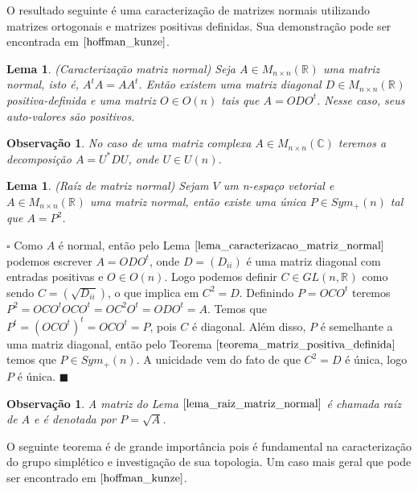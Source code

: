 \documentclass[12pt]{book}
\newtheorem{lema}[teorema]{Lema}
\newtheorem{observacao}[teorema]{Observação}
\newenvironment{prova}[1]{$\square$ #1}{\hfill$\blacksquare$}
\newcommand{\generalgroup}[2]{GL(#1, #2)}
\newcommand{\generalgroupreal}[1]{\generalgroup{#1}{\real{}}}
\newcommand{\matrizortogonal}[1]{O(#1)}
\newcommand{\matrizquadreal}[1]{M_{#1 \times #1}(\real{})}
\newcommand{\matrizsimetricapositiva}[1]{Sym_{+}(#1)}
\newcommand{\matrizunitaria}[1]{U(#1)}
\newcommand{\real}[1]{\mathbb{R}^{#1}}
\begin{document}
	O resultado seguinte é uma caracterização de matrizes normais  utilizando matrizes ortogonais e matrizes positivas definidas. Sua demonstração pode ser encontrada em $\cite{hoffman_kunze}$.
	
	\begin{lema}\label{lema_caracterizacao_matriz_normal}
		(Caracterização matriz normal) Seja $A\in \matrizquadreal{n}$ uma matriz normal, isto é, $A^{t}A=AA^{t}$. Então existem uma matriz diagonal $D \in \matrizquadreal{n}$ positiva-definida e uma matriz $O\in \matrizortogonal{n}$ tais que $A=ODO^{t}$. Nesse caso, seus auto-valores são positivos. 
	\end{lema}
	
	\begin{observacao}\label{observacao_caracterizacao_matriz_normal}
		No caso de uma matriz complexa $A \in M_{n\times n}(\mathbb{C})$ teremos a decomposição $A=U^{*}DU$, onde $U \in \matrizunitaria{n}$.
	\end{observacao}
	
	\begin{lema}\label{lema_raiz_matriz_normal}
		(Raíz de matriz normal) Sejam $V$ um n-espaço vetorial e $A\in \matrizquadreal{n}$ uma matriz normal, então existe uma única $P\in \matrizsimetricapositiva{n}$ tal que $A=P^{2}$. 
	\end{lema}
	\begin{prova}
		Como $A$ é normal, então pelo Lema $\ref{lema_caracterizacao_matriz_normal}$ podemos escrever $A=ODO^{t}$, onde $D=(D_{ii})$ é uma matriz diagonal com entradas positivas e $O\in \matrizortogonal{n}$. Logo podemos definir $C \in \generalgroupreal{n}$ como sendo $C = (\sqrt{D_{ii}})$, o que implica em $C^{2} = D$. Definindo $P = OCO^{t}$ teremos $P^{2} = OCO^{t}OCO^{t} = OC^{2}O^{t} = ODO^{t}=A$. Temos que $P^{t} = (OCO^{t})^{t} = OCO^{t} = P$, pois $C$ é diagonal. Além disso, $P$ é semelhante a uma matriz diagonal, então pelo Teorema $\ref{teorema_matriz_positiva_definida}$ temos que $P \in \matrizsimetricapositiva{n}$. A unicidade vem do fato de que $C^{2} = D$ é única, logo $P$ é única.
	\end{prova}
	
	\begin{observacao}\label{observacao_raiz_matriz_normal}
		A matriz do Lema $\ref{lema_raiz_matriz_normal}$ é chamada raíz de $A$ e é denotada por $P=\sqrt{A}$.
	\end{observacao}
	
	O seguinte teorema é de grande importância pois é fundamental na caracterização do grupo simplético e investigação de sua topologia. Um caso mais geral que pode ser encontrado em $\cite{hoffman_kunze}$.
	
\end{document}
